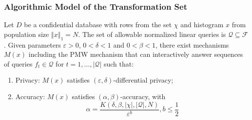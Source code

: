 \begin{frame}[allowframebreaks]%
\frametitle{Algorithmic Model of the Transformation Set}

\begin{theorem}
\label{thm:ppf} Let $D$ be a confidential database with rows from the set $\chi $ and histogram $x$ from population size $%
\left\Vert x\right\Vert _{1}=N$. The set of allowable normalized
linear queries is $\mathcal{Q\subseteq F}$.
Given parameters $\varepsilon >0$, $0<\delta <1$ and $0<\beta <1$, there
exist mechanisms $M(x)$ including the PMW mechanism that can
interactively answer sequences of queries $f_{t}\in \mathcal{Q}$ for $%
t=1,\ldots ,|\mathcal{Q}|$ such that:

\begin{enumerate}
\item Privacy: $M(x)$ satisfies $(\varepsilon ,\delta )$-differential
privacy;

\item Accuracy: $M(x)$ satisfies $(\alpha ,\beta )$-accuracy, with
\begin{equation}
\alpha =\frac{K(\delta ,\beta ,|\chi |,|\mathcal{Q}|,N)}{\varepsilon ^{b}},b \leq \frac{1}{2}
\end{equation}%
\end{enumerate}
\end{theorem}

\end{frame}%
%



